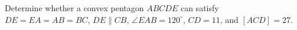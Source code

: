 Determine whether a convex pentagon $ABCDE$ can satisfy $DE=EA=AB=BC$, $DE\parallel CB$, $\angle EAB=120^\circ$, $CD=11$, and $[ACD]=27$.
